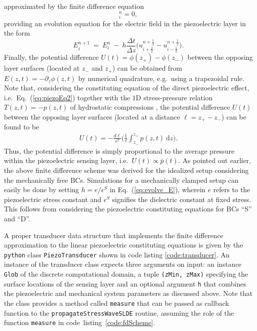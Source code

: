 \documentclass[5p,times,twocolumn]{elsarticle}
\begin{document}
approximated by the finite difference equation 
\begin{equation}
[D_t E + h \, D_z u]_i^n = 0, \label{eq:piezoEl_fd}
\end{equation}
providing an evolution equation for the electric field in the piezoelectric
layer in the form
\begin{equation}
E_{i}^{n+1} ~=~ E_{i}^{n} ~-~ h\frac{\Delta t}{\Delta z} \Big(u_{i+\frac{1}{2}}^{n+\frac{1}{2}} - u_{i-\frac{1}{2}}^{n+\frac{1}{2}}\Big). \label{eq:evolve_E}
\end{equation}
Finally, the potential difference $U(t)=\phi(z_{+})-\phi(z_{-})$ between the
opposing layer surfaces (located at $z_{-}$ and $z_{+}$) can be obtained from
$E(z,t) = - \partial_z \phi(z,t)$ by numerical quadrature, e.g.\ using a
trapezoidal rule. 
Note that, considering the constituting equation of the direct piezoelectric
effect, i.e.\ Eq.\ (\ref{eq:piezoEq2}) together with the $1$D stress-pressure
relation $T(z,t)=-p(z,t)$ of hydrostatic compressions \cite{Landau:1975}, the
potential difference $U(t)$ between the opposing layer surfaces (located at a
distance $\ell=z_{+}-z_{-}$) can be found to be
\begin{align}
U(t) = - \frac{d \ell}{\epsilon^T} \Big( \frac{1}{\ell} \int_{z_{-}}^{z_{+}} p(z,t)~\mathrm{d}z \Big).\label{eq:avPressure}
\end{align}
Thus, the potential difference is simply proportional to the average pressure
within the piezoelectric sensing layer, i.e.\ $U(t)\propto \bar{p}(t)$.  As
pointed out earlier, the above finite difference scheme was derived for the
idealized setup considering the mechanically free BCs.  Simulations for a
mechanically clamped setup can easily be done by setting $h = e/\epsilon^S$ in
Eq.\ (\ref{eq:evolve_E}), wherein $e$ refers to the piezoelectric stress
constant and $\epsilon^{S}$ signifies the dielectric constant at fixed stress.
This follows from considering the piezoelectric constituting equations for BCs
``S'' and ``D''.  

A proper transducer data structure that implements the finite difference
approximation to the linear piezoelectric constituting equations is given by
the {\tt{python}} class {\tt{PiezoTransducer}} shown in code listing
\ref{code:transducer}.  An instance of the transducer class expects three
arguments on input: an instance {\tt{Glob}} of the discrete computational
domain, a tuple {\tt{(zMin, zMax)}} specifying the surface locations of the
sensing layer and an optional argument {\tt{h}} that combines the piezoelectric
and mechanical system parameters as discussed above.  Note that the class
provides a method called {\tt{measure}} that can be passed as callback function
to the {\tt propagateStressWaveSLDE} routine, assuming the role of the function
{\tt measure} in \mbox{code listing \ref{code:fdScheme}.} 
\end{document}
